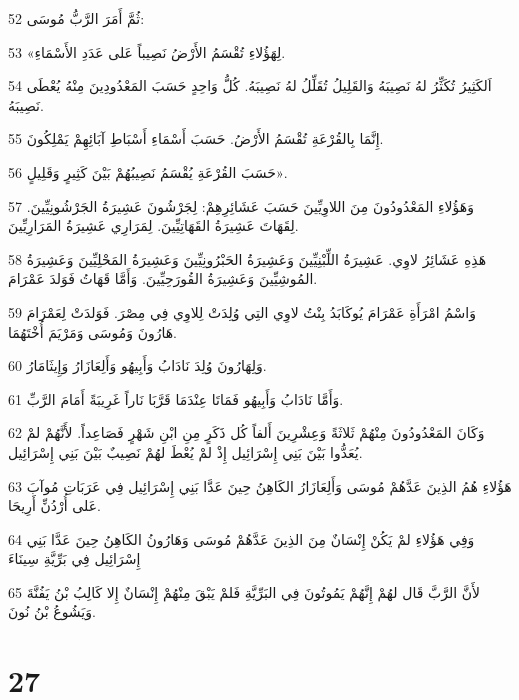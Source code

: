 \par 52 ثُمَّ أَمَرَ الرَّبُّ مُوسَى:
\par 53 «لِهَؤُلاءِ تُقْسَمُ الأَرْضُ نَصِيباً عَلى عَدَدِ الأَسْمَاءِ.
\par 54 اَلكَثِيرُ تُكَثِّرُ لهُ نَصِيبَهُ وَالقَلِيلُ تُقَلِّلُ لهُ نَصِيبَهُ. كُلُّ وَاحِدٍ حَسَبَ المَعْدُودِينَ مِنْهُ يُعْطَى نَصِيبَهُ.
\par 55 إِنَّمَا بِالقُرْعَةِ تُقْسَمُ الأَرْضُ. حَسَبَ أَسْمَاءِ أَسْبَاطِ آبَائِهِمْ يَمْلِكُونَ.
\par 56 حَسَبَ القُرْعَةِ يُقْسَمُ نَصِيبُهُمْ بَيْنَ كَثِيرٍ وَقَلِيلٍ».
\par 57 وَهَؤُلاءِ المَعْدُودُونَ مِنَ اللاوِيِّينَ حَسَبَ عَشَائِرِهِمْ: لِجَرْشُونَ عَشِيرَةُ الجَرْشُونِيِّينَ. لِقَهَاتَ عَشِيرَةُ القَهَاتِيِّينَ. لِمَرَارِي عَشِيرَةُ المَرَارِيِّينَ.
\par 58 هَذِهِ عَشَائِرُ لاوِي. عَشِيرَةُ اللِّبْنِيِّينَ وَعَشِيرَةُ الحَبْرُونِيِّينَ وَعَشِيرَةُ المَحْلِيِّينَ وَعَشِيرَةُ المُوشِيِّينَ وَعَشِيرَةُ القُورَحِيِّينَ. وَأَمَّا قَهَاتُ فَوَلدَ عَمْرَامَ.
\par 59 وَاسْمُ امْرَأَةِ عَمْرَامَ يُوكَابَدُ بِنْتُ لاوِي التِي وُلِدَتْ لِلاوِي فِي مِصْرَ. فَوَلدَتْ لِعَمْرَامَ هَارُونَ وَمُوسَى وَمَرْيَمَ أُخْتَهُمَا.
\par 60 وَلِهَارُونَ وُلِدَ نَادَابُ وَأَبِيهُو وَأَلِعَازَارُ وَإِيثَامَارُ.
\par 61 وَأَمَّا نَادَابُ وَأَبِيهُو فَمَاتَا عِنْدَمَا قَرَّبَا نَاراً غَرِيبَةً أَمَامَ الرَّبِّ.
\par 62 وَكَانَ المَعْدُودُونَ مِنْهُمْ ثَلاثَةً وَعِشْرِينَ أَلفاً كُل ذَكَرٍ مِنِ ابْنِ شَهْرٍ فَصَاعِداً. لأَنَّهُمْ لمْ يُعَدُّوا بَيْنَ بَنِي إِسْرَائِيل إِذْ لمْ يُعْطَ لهُمْ نَصِيبٌ بَيْنَ بَنِي إِسْرَائِيل.
\par 63 هَؤُلاءِ هُمُ الذِينَ عَدَّهُمْ مُوسَى وَأَلِعَازَارُ الكَاهِنُ حِينَ عَدَّا بَنِي إِسْرَائِيل فِي عَرَبَاتِ مُوآبَ عَلى أُرْدُنِّ أَرِيحَا.
\par 64 وَفِي هَؤُلاءِ لمْ يَكُنْ إِنْسَانٌ مِنَ الذِينَ عَدَّهُمْ مُوسَى وَهَارُونُ الكَاهِنُ حِينَ عَدَّا بَنِي إِسْرَائِيل فِي بَرِّيَّةِ سِينَاءَ
\par 65 لأَنَّ الرَّبَّ قَال لهُمْ إِنَّهُمْ يَمُوتُونَ فِي البَرِّيَّةِ فَلمْ يَبْقَ مِنْهُمْ إِنْسَانٌ إِلا كَالِبُ بْنُ يَفُنَّةَ وَيَشُوعُ بْنُ نُونَ.

\chapter{27}

